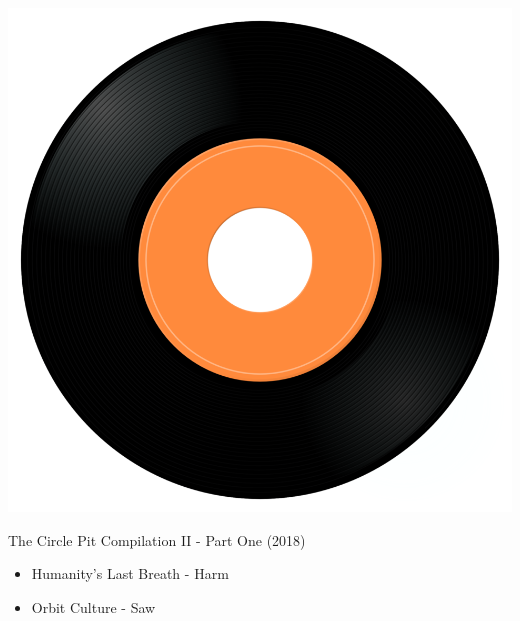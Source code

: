 \begin{minipage}[t]{0.25\textwidth}\vspace{0pt}
\captionsetup{type=figure}
\includegraphics[width=\textwidth]{Images/cover.png}
\caption*{The Circle Pit Compilation II - Part One (2018)}
\end{minipage}
\begin{minipage}[t]{0.25\textwidth}\vspace{0pt}
\begin{itemize}[nosep,leftmargin=1em,labelwidth=*,align=left]
	\setlength{\itemsep}{0pt}
	\item Humanity's Last Breath - Harm
	\item Orbit Culture - Saw
\end{itemize}
\end{minipage}
